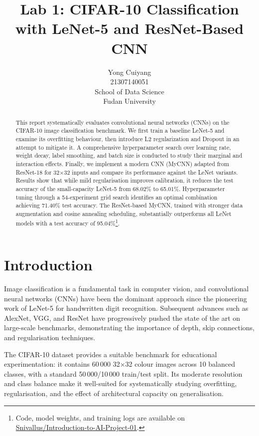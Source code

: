 \documentclass{article}
\title{Lab 1: CIFAR-10 Classification with LeNet-5 and ResNet-Based CNN}
\author{
  Yong Cuiyang\\
  21307140051\\
  School of Data Science\\
  Fudan University\\
}
\begin{document}
\maketitle


\begin{abstract}
  This report systematically evaluates convolutional neural networks (CNNs) on the CIFAR-10 image classification benchmark. 
  We first train a baseline LeNet-5 and examine its overfitting behaviour, 
  then introduce L2 regularization and Dropout in an attempt to mitigate it. 
  A comprehensive hyperparameter search over learning rate, weight decay, label smoothing, 
  and batch size is conducted to study their marginal and interaction effects. 
  Finally, we implement a modern CNN (MyCNN) adapted from ResNet-18 for 32$\times$32 inputs 
  and compare its performance against the LeNet variants. 
  Results show that while mild regularisation improves calibration, 
  it reduces the test accuracy of the small-capacity LeNet-5 from 68.02\% to 65.01\%. 
  Hyperparameter tuning through a 54-experiment grid search identifies an optimal combination achieving 71.40\% test accuracy. 
  The ResNet-based MyCNN, trained with stronger data augmentation and cosine annealing scheduling, 
  substantially outperforms all LeNet models with a test accuracy of 95.04\%\footnote{Code, model weights, and training logs are available on \href{https://github.com/Snivallus/Introduction-to-AI-Project-01}{Snivallus/Introduction-to-AI-Project-01}.}.
\end{abstract}


\section{Introduction}\label{sec:introduction}

Image classification is a fundamental task in computer vision, 
and convolutional neural networks (CNNs) have been the dominant approach 
since the pioneering work of LeNet-5 \citep{lecun1998gradient} for handwritten digit recognition. 
Subsequent advances such as AlexNet, VGG, and ResNet \citep{he2016deep} 
have progressively pushed the state of the art on large-scale benchmarks, 
demonstrating the importance of depth, skip connections, and regularisation techniques.

The CIFAR-10 dataset \citep{krizhevsky2009learning} provides a suitable benchmark for educational experimentation: 
it contains 60\,000 32$\times$32 colour images across 10 balanced classes, 
with a standard 50\,000/10\,000 train/test split. 
Its moderate resolution and class balance make it well-suited for systematically studying overfitting, 
regularisation, and the effect of architectural capacity on generalisation.
\end{document}
